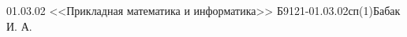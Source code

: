 \documentclass[a4paper, fleqn, 14pt, titlepage]{extarticle}
\begin{document}
     {01.03.02 <<Прикладная математика и информатика>>} {Б9121-01.03.02сп(1)}{Бабак И. А.}

    \tableofcontents

    \pagebreak

    
    \pagebreak

    
    \pagebreak

    
    \pagebreak

    
    \pagebreak

    
\end{document}
